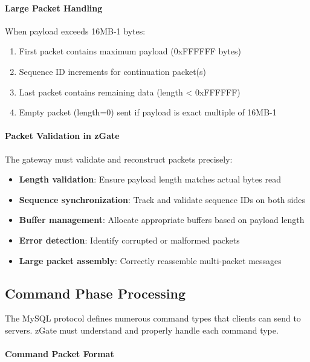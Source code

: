 \paragraph{Large Packet Handling}

When payload exceeds 16MB-1 bytes:
\begin{enumerate}
    \item First packet contains maximum payload (0xFFFFFF bytes)
    \item Sequence ID increments for continuation packet(s)
    \item Last packet contains remaining data (length < 0xFFFFFF)
    \item Empty packet (length=0) sent if payload is exact multiple of 16MB-1
\end{enumerate}

\paragraph{Packet Validation in zGate}

The gateway must validate and reconstruct packets precisely:

\begin{itemize}
    \item \textbf{Length validation}: Ensure payload length matches actual bytes read
    \item \textbf{Sequence synchronization}: Track and validate sequence IDs on both sides
    \item \textbf{Buffer management}: Allocate appropriate buffers based on payload length
    \item \textbf{Error detection}: Identify corrupted or malformed packets
    \item \textbf{Large packet assembly}: Correctly reassemble multi-packet messages
\end{itemize}

\subsection{Command Phase Processing}

The MySQL protocol defines numerous command types that clients can send to servers. zGate must understand and properly handle each command type.

\paragraph{Command Packet Format}

